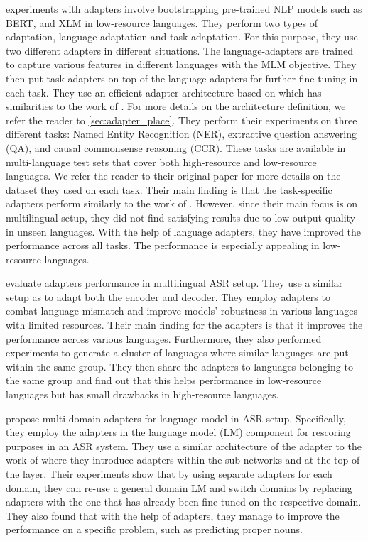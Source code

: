  experiments with adapters involve bootstrapping pre-trained NLP models such as BERT, and XLM  in low-resource languages. They perform two types of adaptation, language-adaptation and task-adaptation. For this purpose, they use two different adapters in different situations. The language-adapters are trained to capture various features in different languages with the MLM objective. They then put task adapters on top of the language adapters for further fine-tuning in each task. They use an efficient adapter architecture based on  which has similarities to the work of . For more details on the architecture definition, we refer the reader to \cref{sec:adapter_place}. They perform their experiments on three different tasks: Named Entity Recognition (NER), extractive question answering (QA), and causal commonsense reasoning (CCR). These tasks are available in multi-language test sets that cover both high-resource and low-resource languages. We refer the reader to their original paper for more details on the dataset they used on each task. Their main finding is that the task-specific adapters perform similarly to the work of . However, since their main focus is on multilingual setup, they did not find satisfying results due to low output quality in unseen languages. With the help of language adapters, they have improved the performance across all tasks. The performance is especially appealing in low-resource languages.

 evaluate adapters performance in multilingual ASR setup. They use a similar setup as  to adapt both the encoder and decoder. They employ adapters to combat language mismatch and improve models' robustness in various languages with limited resources. Their main finding for the adapters is that it improves the performance across various languages. Furthermore, they also performed experiments to generate a cluster of languages where similar languages are put within the same group. They then share the adapters to languages belonging to the same group and find out that this helps performance in low-resource languages but has small drawbacks in high-resource languages.

 propose multi-domain adapters for language model in ASR setup. Specifically, they employ the adapters in the language model (LM) component for rescoring purposes in an ASR system. They use a similar architecture of the adapter to the work of  where they introduce adapters within the sub-networks and at the top of the layer. Their experiments show that by using separate adapters for each domain, they can re-use a general domain LM and switch domains by replacing adapters with the one that has already been fine-tuned on the respective domain. They also found that with the help of adapters, they manage to improve the performance on a specific problem, such as predicting proper nouns.

